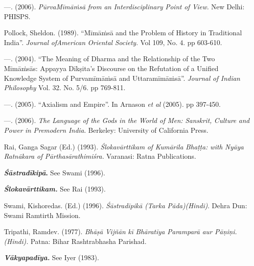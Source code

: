 \begin{thebibliography}{99}
  —. (2006). \textit{PūrvaMīmāṁsā from an Interdisciplinary Point of View.} New Delhi: PHISPS. 

  Pollock, Sheldon. (1989). “Mīmāṁsā and the Problem of History in Traditional India”. \textit{Journal ofAmerican Oriental Society.} Vol 109, No. 4. pp 603-610.

  —. (2004). “The Meaning of Dharma and the Relationship of the Two Mīmāṁsās: Appayya Dīkṣita’s Discourse on the Refutation of a Unified Knowledge System of Purvamīmāṁsā and Uttaramīmāṁsā”. \textit{Journal of Indian Philosophy} Vol. 32. No. 5/6. pp 769-811. 

  —. (2005). “Axialism and Empire”. In Arnason \textit{et al} (2005). pp 397-450.

  —. (2006). \textit{The Language of the Gods in the World of Men: Sanskrit, Culture and Power in Premodern India}. Berkeley: University of California Press.

  Rai, Ganga Sagar (Ed.) (1993). \textit{Ślokavārttikam of Kumārila Bhaṭṭa: with Nyāya Ratnākara of Pārthasārathimiśra.} Varanasi: Ratna Publications.

  \textbf{\textit{Śāstradīkipā}.} See Swami (1996).

  \textbf{\textit{Ślokavārttikam.}} See Rai (1993).

  Swami, Kishoredas. (Ed.) (1996). \textit{Śāstradīpikā (Tarka Pāda)(Hindi)}. Dehra Dun: Swami Ramtirth Mission.

  Tripathi, Ramdev. (1977). \textit{Bhāṣā Vijñān kī Bhāratīya Paramparā aur Pāṇiṇi. (Hindi).} Patna: Bihar Rashtrabhasha Parishad.

  \textbf{\textit{Vākyapadīya.}} See Iyer (1983).
 
 \end{thebibliography}
